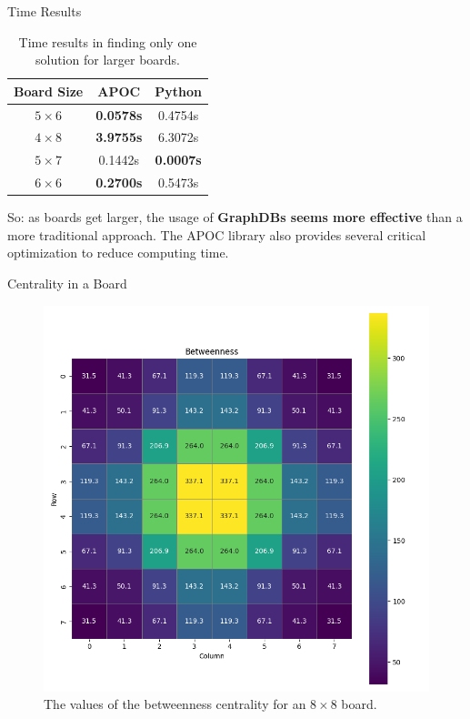\documentclass{beamer}
\begin{document}
	\begin{frame}{Time Results}
\begin{table}[ht]
	\centering
	\begin{tabular}{|c|c c|}
		\hline
		\textbf{Board Size} & \textbf{APOC} & \textbf{Python} \\ \hline
		\textbf{$5 \times 6$} & \textbf{0.0578s} & 0.4754s \\ \hline
		\textbf{$4 \times 8$} & \textbf{3.9755s} & 6.3072s \\ \hline
		\textbf{$5 \times 7$} & 0.1442s & \textbf{0.0007s} \\ \hline
		\textbf{$6 \times 6$} & \textbf{0.2700s} & 0.5473s \\ \hline
	\end{tabular}
	\caption{Time results in finding only one solution for larger boards.}
	\label{tab:onesolL}
\end{table}
	So: as boards get larger, the usage of \textbf{GraphDBs seems more effective} than a more traditional approach. The APOC library also provides several critical optimization to reduce computing time.
	\end{frame}
	
	\begin{frame}{Centrality in a Board}
		\begin{figure}[ht]
			\centering
			\includegraphics[width=0.75\linewidth]{centrality.png}
			\caption{The values of the betweenness centrality for an $8 \times 8$ board.}
			\label{fig:centrality}
		\end{figure}
	\end{frame}
	
\end{document}
